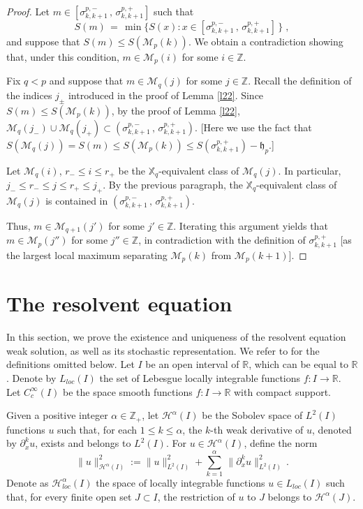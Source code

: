 \documentclass[reqno]{amsart}
\theoremstyle{plain}
\theoremstyle{definition}
\newcommand{\mc}[1]{{\mathcal #1}}
\newcommand{\mf}[1]{{\mathfrak #1}}
\newcommand{\bb}[1]{{\mathbb #1}}
\newcommand{\ms}[1]{{\mathscr #1}}
\newcounter{as}[section]
\newcommand{\<}{\langle}
\renewcommand{\>}{\rangle}
\begin{document}
\begin{proof}
Let $m\in [\sigma^{p,-}_{k,k+1} \,,\, \sigma^{p,+}_{k,k+1} ]$ such that
\begin{equation*}
S(m) \,=\, \min \big\{ S(x) : x \in
[\sigma^{p,-}_{k,k+1} \,,\, \sigma^{p,+}_{k,k+1} ] \,\big\} \;,
\end{equation*}
and suppose that $S(m) \le S(\ms M_{p}(k))$. We obtain a contradiction
showing that, under this condition, $m\in \ms M_{p}(i)$ for some
$i\in\bb Z$.

Fix $q<p$ and suppose that $m\in \ms M_{q}(j)$ for some $j\in\bb
Z$. Recall the definition of the indices $j_\pm$ introduced in the
proof of Lemma \ref{l22}. Since $S(m) \le S(\ms M_{p}(k))$, by the
proof of Lemma \ref{l22},
$\ms M_{q}(j_-) \cup \ms M_{q}(j_+) \subset (\sigma^{p,-}_{k,k+1}
\,,\, \sigma^{p,+}_{k,k+1})$. [Here we use the fact that
$S(\ms M_{q}(j)) = S(m) \le S(\ms M_{p}(k)) \le
S(\sigma^{p,+}_{k,k+1}) -  \mf h_p$.]

Let $\ms M_{q}(i)$, $r_-\le i\le r_+$ be the $\bb X_q$-equivalent class
of $\ms M_{q}(j)$. In particular, $j_-\le r_- \le j\le r_+\le j_+$. By
the previous paragraph, the $\bb X_q$-equivalent class of
$\ms M_{q}(j)$ is contained in
$(\sigma^{p,-}_{k,k+1} \,,\, \sigma^{p,+}_{k,k+1})$.

Thus, $m\in \ms M_{q+1}(j')$ for some $j'\in\bb Z$. Iterating this
argument yields that $m\in \ms M_{p}(j'')$ for some $j''\in\bb Z$, in
contradiction with the definition of $\sigma^{p,+}_{k,k+1}$ [as the
largest local maximum separating $\ms M_{p}(k)$ from
$\ms M_{p}(k+1)$].
\end{proof}

\section{The resolvent equation}
\label{sec-ap1}

In this section, we prove the existence and uniqueness of the
resolvent equation weak solution, as well as its stochastic
representation. We refer to \cite{le} for the definitions omitted
below.  Let $I$ be an open interval of $\bb R$, which can be equal to
$\bb R$.  Denote by $L_{loc}(I)$ the set of Lebesgue locally
integrable functions $f\colon I \to\bb R$. Let $C_c^{\infty}(I)$ be
the space smooth functions $f\colon I \to \bb R$ with compact support.

Given a positive integer $\alpha\in \bb Z_{+}$, let
$\mc H^{\alpha}(I)$ be the Sobolev space of $L^2(I)$ functions $u$
such that, for each $1\leq k \leq \alpha$, the $k$-th weak derivative
of $u$, denoted by $\partial_x^{k}u$, exists and belongs to
$L^2(I)$. For $u\in \mc H^{\alpha}(I)$, define the norm
\begin{equation*}
\lVert u \rVert^2_{\mc H^{\alpha}(I)} :=
\lVert u \rVert_{L^2(I)}^{2}
+ \sum_{k=1}^{\alpha}
\, \lVert \partial_x^{k}u \rVert_{L^2(I)}^{2} \,.
\end{equation*} 
Denote as $\mc H_{loc}^{\alpha}(I)$ the space of locally integrable
functions $u\in L_{loc}(I)$ such that, for every finite open set
$J\subset I$, the restriction of $u$ to $J$ belongs to
$\mc H^{\alpha}(J)$.
\end{document}

